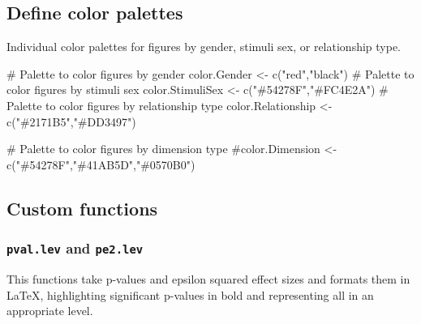 \documentclass[
  bookmarksnumbered]{article}
\newenvironment{Shaded}{\begin{snugshade}}{\end{snugshade}}
\newcommand{\CommentTok}[1]{\textcolor[rgb]{0.50,0.62,0.50}{#1}}
\newcommand{\FunctionTok}[1]{\textcolor[rgb]{0.94,0.94,0.56}{#1}}
\newcommand{\NormalTok}[1]{\textcolor[rgb]{0.80,0.80,0.80}{#1}}
\newcommand{\OtherTok}[1]{\textcolor[rgb]{0.94,0.94,0.56}{#1}}
\newcommand{\StringTok}[1]{\textcolor[rgb]{0.80,0.58,0.58}{#1}}
\begin{document}
\subsection{Define color palettes}\label{define-color-palettes}

Individual color palettes for figures by gender, stimuli sex, or relationship type.

\begin{Shaded}
\begin{Highlighting}[]
\CommentTok{\# Palette to color figures by gender}
\NormalTok{color.Gender }\OtherTok{\textless{}{-}} \FunctionTok{c}\NormalTok{(}\StringTok{"red"}\NormalTok{,}\StringTok{"black"}\NormalTok{)}
\CommentTok{\# Palette to color figures by stimuli sex}
\NormalTok{color.StimuliSex }\OtherTok{\textless{}{-}} \FunctionTok{c}\NormalTok{(}\StringTok{"\#54278F"}\NormalTok{,}\StringTok{"\#FC4E2A"}\NormalTok{)}
\CommentTok{\# Palette to color figures by relationship type}
\NormalTok{color.Relationship }\OtherTok{\textless{}{-}} \FunctionTok{c}\NormalTok{(}\StringTok{"\#2171B5"}\NormalTok{,}\StringTok{"\#DD3497"}\NormalTok{)}



\CommentTok{\# Palette to color figures by dimension type}
\CommentTok{\#color.Dimension \textless{}{-} c("\#54278F","\#41AB5D","\#0570B0")}
\end{Highlighting}
\end{Shaded}

\subsection{Custom functions}\label{custom-functions}

\subsubsection{\texorpdfstring{\texttt{pval.lev} and \texttt{pe2.lev}}{pval.lev and pe2.lev}}\label{pval.lev-and-pe2.lev}

This functions take p-values and epsilon squared effect sizes and formats them in \LaTeX, highlighting significant p-values in bold and representing all in an appropriate level.
\end{document}
